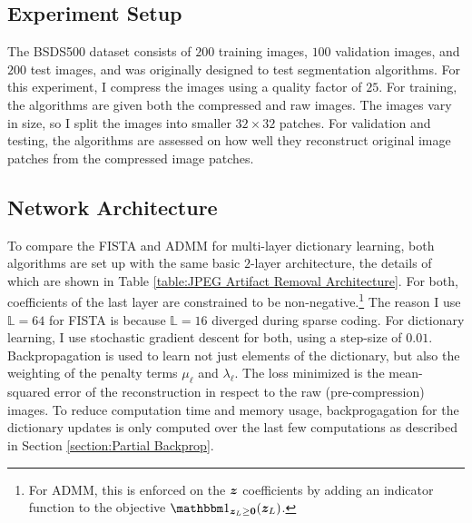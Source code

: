 \subsection{Experiment Setup}
The BSDS500 dataset consists of $200$ training images, $100$ validation images, and $200$ test images, and was originally designed to test segmentation algorithms. For this experiment, I compress the images using a quality factor of $25$. For training, the algorithms are given both the compressed and raw images. The images vary in size, so I split the images into smaller $32 \times 32$ patches. For validation and testing, the algorithms are assessed on how well they reconstruct original image patches from the compressed image patches.
\subsection{Network Architecture}
To compare the FISTA and ADMM for multi-layer dictionary learning, both algorithms are set up with the same basic $2$-layer architecture, the details of which are shown in Table \ref{table:JPEG Artifact Removal Architecture}. For both, coefficients of the last layer are constrained to be non-negative.\footnote{For ADMM, this is enforced on the $\bm{z}$ coefficients by adding an indicator function to the objective $\indicator_{\vz_L \geq \vzero}(\vz_L)$.}  The reason I use $\mathbb{L} = 64$ for FISTA is because $\mathbb{L} = 16$ diverged during sparse coding. For dictionary learning, I use stochastic gradient descent for both, using a step-size of $0.01$. Backpropagation is used to learn not just elements of the dictionary, but also the weighting of the penalty terms $\mu_{\ell}$ and $\lambda_{\ell}$. The loss minimized is the mean-squared error of the reconstruction in respect to the raw (pre-compression) images. To reduce computation time and memory usage, backprogagation for the dictionary updates is only computed over the last few computations as described in Section \ref{section:Partial Backprop}.
